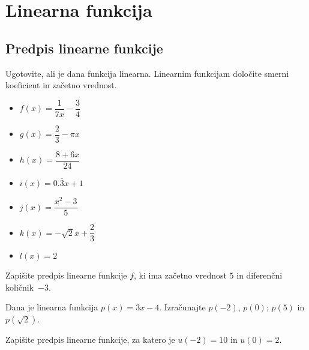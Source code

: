 \newpage


    \section{Linearna funkcija}

        \subsection*{Predpis linearne funkcije}
        



        
            \begin{naloga}
                Ugotovite, ali je dana funkcija linearna. Linearnim funkcijam določite smerni koeficient in začetno vrednost.
                \begin{multicols}{2}
                \begin{itemize}
                        \item $f(x)=\dfrac{1}{7x}-\dfrac{3}{4}$ 
                        \item $g(x)=\dfrac{2}{3}-\pi x$ 
                        \item $h(x)=\dfrac{8+6x}{24}$ 
                        \item $i(x)=0.\overline{3}x+1$ 
                        \item $j(x)=\dfrac{x^2-3}{5}$ 
                        \item $k(x)=-\sqrt{2}x+\dfrac{2}{3}$ 
                        \item $l(x)=2$ 
                    \end{itemize}
                \end{multicols}
            \end{naloga}
        



        
            \begin{naloga}
                Zapišite predpis linearne funkcije $f$, ki ima začetno vrednost $5$ in diferenčni količnik~$-3$. 
            \end{naloga}

            \begin{naloga}
                Dana je linearna funkcija $p(x)=3x-4$. Izračunajte $p(-2)$, $p(0)$; $p(5)$ in $p(\sqrt{2})$. 
            \end{naloga}

            \begin{naloga}
                Zapišite predpis linearne funkcije, za katero je $u(-2)=10$ in $u(0)=2$. 
            \end{naloga}

